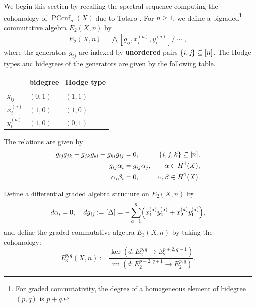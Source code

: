 \documentclass[11pt,reqno]{amsproc}
\numberwithin{equation}{section}
\theoremstyle{definition}
\theoremstyle{remark}
\DeclareMathOperator{\im}{im}
\newcommand\subeq{\subseteq}
\DeclarePairedDelimiter{\set}{\{}{\}}
\DeclarePairedDelimiter{\parens}{\lparen}{\rparen}
\DeclareMathOperator{\PConf}{PConf}
\newcommand{\spp}[1]{^{(#1)}}
\begin{document}
We begin this section by recalling the spectral sequence computing the cohomology of $\PConf_n(X)$ due to Totaro \cite{totaro1996configuration}. For $n\geq 1$, we define a bigraded\footnote{For graded commutativity, the degree of a homogeneous element of bidegree $(p,q)$ is $p+q$.} commutative algebra $E_2(X,n)$ by
\begin{align}
E_2(X,n)=\bigwedge[g_{ij}, x\spp{a}_i, y\spp{a}_i]/{\sim}, \label{eq:E2Page}
\end{align}
where the generators $g_{ij}$ are indexed by \textbf{unordered} pairs $\set{i,j}\subeq [n]$. The Hodge types and bidegrees of the generators are given by the following table.
\begin{center}
\begin{tabular}{l|l|l}
 & bidegree & Hodge type \\
 \hline
 $g_{ij}$ & $(0,1)$ & $(1,1)$ \\
 $x\spp{a}_i$ & $(1,0)$ & $(1,0)$\\
 $y\spp{a}_i$ & $(1,0)$ & $(0,1)$
\end{tabular}
\end{center}
The relations are given by
\begin{align}
g_{ij}g_{jk}+g_{jk}g_{ki}+g_{ki}g_{ij}&=0,& \set{i,j,k}\subeq [n],\label{eq:rel1}\\
g_{ij}\alpha_i&=g_{ij}\alpha_j, & \alpha\in H^1(X),\label{eq:rel2}\\
\alpha_i\beta_i&=0, & \alpha,\beta\in H^1(X).\label{eq:rel3}
\end{align}

Define a differential graded algebra structure on $E_2(X,n)$ by
\begin{equation}\label{eq:differential}
d\alpha_i=0, \quad dg_{ij}:=[\Delta]=-\sum_{a=1}^g \parens*{x\spp{a}_1 y\spp{a}_2+x\spp{a}_2 y\spp{a}_1},
\end{equation}
and define the graded commutative algebra $E_3(X,n)$ by taking the cohomology:
\begin{equation}\label{eq:cohomology}
E_3^{p,q}(X,n):=\frac{\ker(d: E_2^{p,q}\to E_2^{p+2,q-1})}{\im(d: E_2^{p-2,q+1}\to E_2^{p,q})}.
\end{equation}
\end{document}
